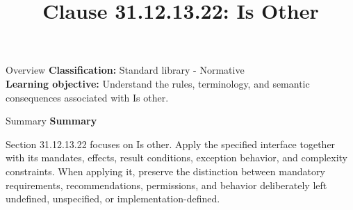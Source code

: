\documentclass[10pt,letterpaper]{article}
\title{Clause 31.12.13.22: Is Other}
\author{}
\date{}
\begin{document}
\maketitle
\begin{CornellOverviewBox}{Overview}
\textbf{Classification:} Standard library - Normative\\[2pt]
\textbf{Learning objective:} Understand the rules, terminology, and semantic consequences associated with Is other.
\end{CornellOverviewBox}\begin{CornellSummaryBox}{Summary}
{\sffamily\bfseries\color{Accent} Summary}\par\vspace{3pt}Section 31.12.13.22 focuses on Is other. Apply the specified interface together with its mandates, effects, result conditions, exception behavior, and complexity constraints. When applying it, preserve the distinction between mandatory requirements, recommendations, permissions, and behavior deliberately left undefined, unspecified, or implementation-defined.
\end{CornellSummaryBox}
\end{document}
